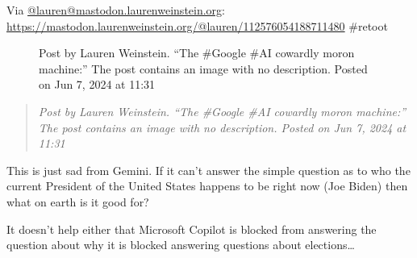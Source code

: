 Via
\href{https://mastodon.laurenweinstein.org/@lauren/}{@lauren@mastodon.laurenweinstein.org}:
\url{https://mastodon.laurenweinstein.org/@lauren/112576054188711480}
\#retoot

\begin{figure}
\centering
{}
\caption{Post by Lauren Weinstein. ``The \#Google \#AI cowardly moron
machine:'' The post contains an image with no description. Posted on Jun
7, 2024 at 11:31}
\end{figure}

\begin{quote}
\emph{Post by Lauren Weinstein. ``The \#Google \#AI cowardly moron
machine:'' The post contains an image with no description. Posted on Jun
7, 2024 at 11:31}
\end{quote}

This is just sad from Gemini. If it can't answer the simple question as
to who the current President of the United States happens to be right
now (Joe Biden) then what on earth is it good for?

It doesn't help either that Microsoft Copilot is blocked from answering
the question about why it is blocked answering questions about
elections\ldots{}
